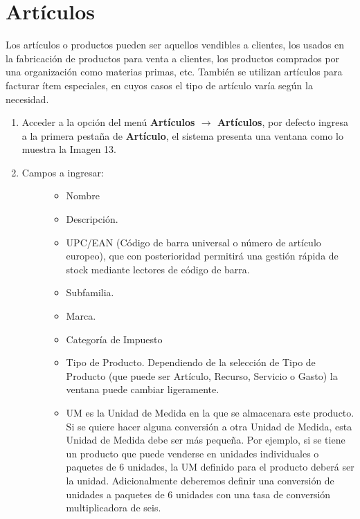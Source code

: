 \documentclass[letterpaper,10pt,spanish]{sphinxmanual}
\begin{document}
\section{Artículos}
\label{maestros:articulos}
Los artículos o productos pueden ser aquellos vendibles a clientes, los usados en la fabricación de productos para venta a clientes, los productos comprados por una organización como materias primas, etc. También se utilizan artículos para facturar ítem especiales, en cuyos casos el tipo de artículo varía según la necesidad.
\begin{enumerate}
\item {} 
Acceder a la opción del menú \textbf{Artículos \(\rightarrow\)  Artículos}, por defecto ingresa a la primera pestaña de \textbf{Artículo}, el sistema presenta una ventana como lo muestra la Imagen 13.

\item {} \begin{description}
\item[{Campos a ingresar:}] \leavevmode\begin{itemize}
\item {} 
Nombre

\item {} 
Descripción.

\item {} 
UPC/EAN (Código de barra universal o número de artículo europeo), que con posterioridad permitirá una gestión rápida de stock mediante lectores de código de barra.

\item {} 
Subfamilia.

\item {} 
Marca.

\item {} 
Categoría de Impuesto

\item {} 
Tipo de Producto. Dependiendo de la selección de Tipo de Producto (que puede ser Artículo, Recurso, Servicio o Gasto) la ventana puede cambiar ligeramente.

\item {} 
UM es la Unidad de Medida en la que se almacenara este producto. Si se quiere hacer alguna conversión a otra Unidad de Medida, esta Unidad de Medida debe ser más pequeña. Por ejemplo, si se tiene un producto que puede venderse en unidades individuales o paquetes de 6 unidades, la UM definido para el producto deberá ser la unidad. Adicionalmente deberemos definir una conversión de unidades a paquetes de 6 unidades con una tasa de conversión multiplicadora de seis.


\end{itemize}
\end{description}
\end{enumerate}
\end{document}
